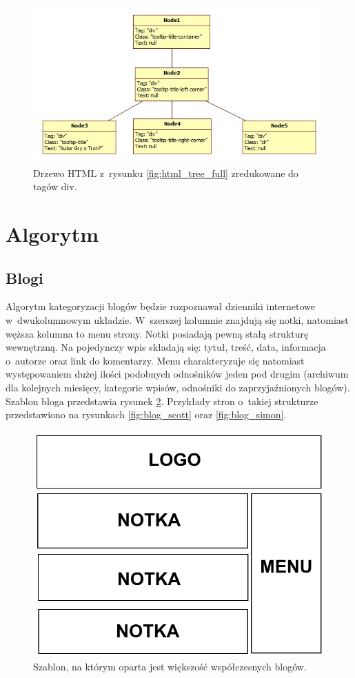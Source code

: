 \documentclass[a4paper,10pt]{article}
\begin{document}
\begin{figure}[h!]
\centering
  \includegraphics[width=.9\textwidth]{html_tree_cropped.jpg}
  \caption{Drzewo HTML z~rysunku \ref{fig:html_tree_full} zredukowane do tagów div.}
  \label{fig:html_tree_cropped}
\end{figure}

\section*{Algorytm}
\subsection*{Blogi}

Algorytm kategoryzacji blogów będzie rozpoznawał dzienniki internetowe w~dwukolumnowym układzie. W~szerszej kolumnie znajdują się notki, natomiast węższa kolumna to menu strony. Notki posiadają pewną stałą strukturę wewnętrzną. Na pojedynczy wpis składają się: tytuł, treść, data, informacja o~autorze oraz link do komentarzy. Menu charakteryzuje się natomiast występowaniem dużej ilości podobnych odnośników jeden pod drugim (archiwum dla kolejnych miesięcy, kategorie wpisów, odnośniki do zaprzyjaźnionych blogów). Szablon bloga przedstawia rysunek \ref{fig:blog_template}. Przykłady stron o~takiej strukturze przedstawiono na rysunkach \ref{fig:blog_scott} oraz \ref{fig:blog_simon}.

\begin{figure}[h!]
\centering
  \includegraphics[width=.5\textwidth]{blog_template.png}
  \caption{Szablon, na którym oparta jest większość współczesnych blogów.}
  \label{fig:blog_template}
\end{figure}
\end{document}
